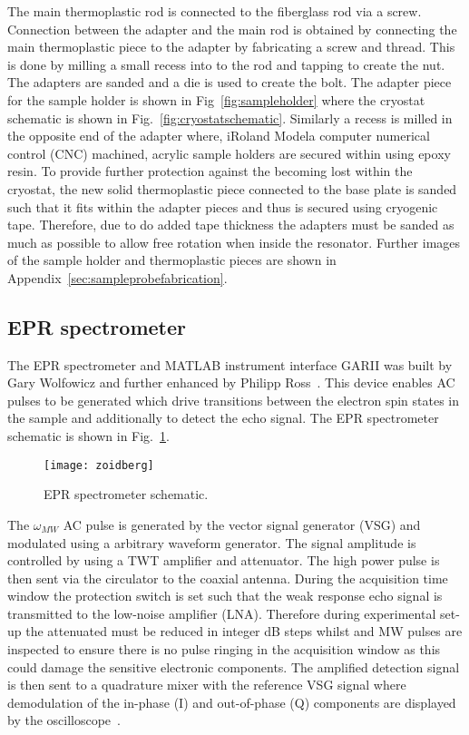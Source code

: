 The main thermoplastic rod is connected to the fiberglass rod via a screw. Connection between the adapter and the main rod is obtained by connecting the main thermoplastic piece to the adapter by fabricating a screw and thread. This is done by milling a small recess into to the rod and tapping to create the nut. The adapters are sanded and a die is used to create the bolt. The adapter piece for the sample holder is shown in Fig~\ref{fig:sampleholder} where the cryostat schematic is shown in Fig.~\ref{fig:cryostatschematic}. Similarly a recess is milled in the opposite end of the adapter where, iRoland Modela computer numerical control (CNC) machined, acrylic sample holders are secured within using epoxy resin. To provide further protection against the becoming lost within the cryostat, the new solid thermoplastic piece connected to the base plate is sanded such that it fits within the adapter pieces and thus is secured using cryogenic tape. Therefore, due to do added tape thickness the adapters must be sanded as much as possible to allow free rotation when inside the resonator. Further images of the sample holder and thermoplastic pieces are shown in Appendix~\ref{sec:sampleprobefabrication}.


\subsection{EPR spectrometer}
The EPR spectrometer and MATLAB instrument interface GARII was built by Gary Wolfowicz and further enhanced by Philipp Ross~\citep{mansirthesis}. This device enables AC pulses to be generated which drive transitions between the electron spin states in the sample and additionally to detect the echo signal. The EPR spectrometer schematic is shown in Fig.~\ref{fig:zoidberg}. 

\begin{figure}[h]
\centering
\texttt{[image: zoidberg]}
\caption{\label{fig:zoidberg} EPR spectrometer schematic\citep{mansirthesis}.}
\end{figure}

The $\omega_{MW}$ AC pulse is generated by the vector signal generator (VSG) and modulated using a arbitrary waveform generator. The signal amplitude is controlled by using a TWT amplifier and attenuator. The high power pulse is then sent via the circulator to the coaxial antenna. During the acquisition time window the protection switch is set such that the weak response echo signal is transmitted to the low-noise amplifier (LNA). Therefore during experimental set-up the attenuated must be reduced in integer dB steps whilst and MW pulses are inspected to ensure there is no pulse ringing in the acquisition window as this could damage the sensitive electronic components. The amplified detection signal is then sent to a quadrature mixer with the reference VSG signal where demodulation of the in-phase (I) and out-of-phase (Q) components are displayed by the oscilloscope~\citep{goldfarb2018epr}. 



